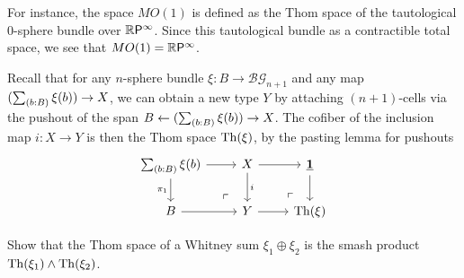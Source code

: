 \documentclass[reqno]{amsart}
\begin{document}
For instance, the space $MO(1)$ is defined as the Thom space of the tautological
$0$-sphere bundle over $\mathbb{R}\mathsf{P}^{\infty}$. Since this tautological bundle
as a contractible total space, we see that $MO(1)=\mathbb{R}\mathsf{P}^{\infty}$.

Recall that for any $n$-sphere bundle $\xi:B\to\mathcal{BG}_{n+1}$ and any
map $(\sm{b:B}\xi(b))\to X$, we can obtain a new type $Y$ by attaching $(n+1)$-cells
via the pushout of the span $B \leftarrow (\sm{b:B}\xi(b)) \rightarrow X$. The cofiber of
the inclusion map $i:X\to Y$ is then the Thom space $\mathrm{Th}(\xi)$, by the pasting
lemma for pushouts
\begin{equation*}
\begin{tikzcd}
\sm{b:B}\xi(b) \arrow[d,swap,"\pi_1"] \arrow[r] \arrow[dr,phantom,near end,"\ulcorner"] & X \arrow[d,"i"] \arrow[r] \arrow[dr,phantom,very near end,"\ulcorner"] & \unit \arrow[d] \\
B \arrow[r] & Y \arrow[r] & \Thom(\xi)
\end{tikzcd}
\end{equation*}

\begin{proposal}\label{p:smash_thom}
Show that the Thom space of a Whitney sum $\xi_1\oplus\xi_2$ is the smash product
$\mathrm{Th}(\xi_1) \wedge \mathrm{Th}(\xi_2)$. 
\end{proposal}
\end{document}
